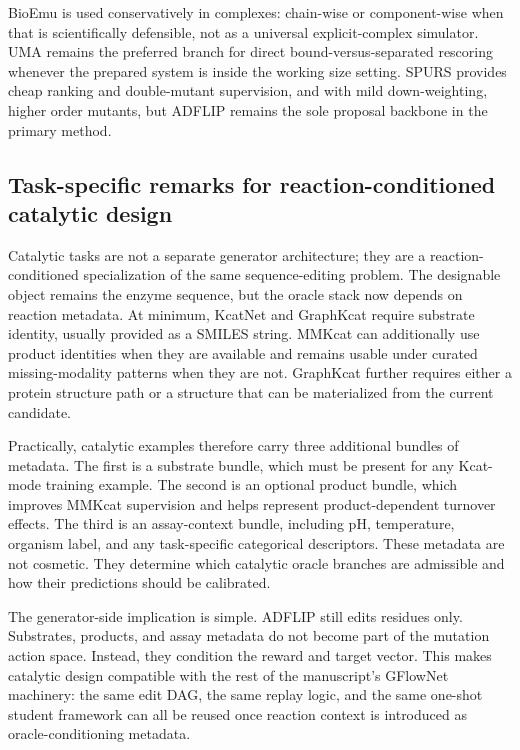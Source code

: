 \documentclass[11pt]{article}
\begin{document}
	BioEmu is used conservatively in complexes: chain-wise or component-wise when that is scientifically defensible, not as a universal explicit-complex simulator. UMA remains the preferred branch for direct bound-versus-separated rescoring whenever the prepared system is inside the working size setting. SPURS provides cheap ranking and double-mutant supervision, and with mild down-weighting, higher order mutants, but ADFLIP remains the sole proposal backbone in the primary method.
	
	\subsection{Task-specific remarks for reaction-conditioned catalytic design}
	
	Catalytic tasks are not a separate generator architecture; they are a reaction-conditioned specialization of the same sequence-editing problem. The designable object remains the enzyme sequence, but the oracle stack now depends on reaction metadata. At minimum, KcatNet and GraphKcat require substrate identity, usually provided as a SMILES string. MMKcat can additionally use product identities when they are available and remains usable under curated missing-modality patterns when they are not. GraphKcat further requires either a protein structure path or a structure that can be materialized from the current candidate.
	
	Practically, catalytic examples therefore carry three additional bundles of metadata. The first is a substrate bundle, which must be present for any Kcat-mode training example. The second is an optional product bundle, which improves MMKcat supervision and helps represent product-dependent turnover effects. The third is an assay-context bundle, including pH, temperature, organism label, and any task-specific categorical descriptors. These metadata are not cosmetic. They determine which catalytic oracle branches are admissible and how their predictions should be calibrated.
	
	The generator-side implication is simple. ADFLIP still edits residues only. Substrates, products, and assay metadata do not become part of the mutation action space. Instead, they condition the reward and target vector. This makes catalytic design compatible with the rest of the manuscript's GFlowNet machinery: the same edit DAG, the same replay logic, and the same one-shot student framework can all be reused once reaction context is introduced as oracle-conditioning metadata.
	
\end{document}
